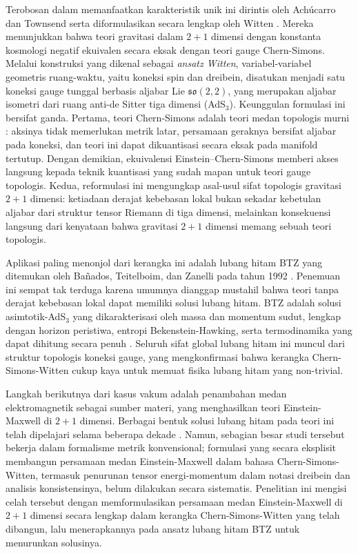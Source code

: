 Terobosan dalam memanfaatkan karakteristik unik ini dirintis oleh Ach\'ucarro dan Townsend \cite{achucarro1986} serta diformulasikan secara lengkap oleh Witten \cite{witten1988}. Mereka menunjukkan bahwa teori gravitasi dalam $2+1$ dimensi dengan konstanta kosmologi negatif ekuivalen secara eksak dengan teori gauge Chern-Simons. Melalui konstruksi yang dikenal sebagai \textit{ansatz Witten}, variabel-variabel geometris ruang-waktu, yaitu koneksi spin dan dreibein, disatukan menjadi satu koneksi gauge tunggal berbasis aljabar Lie $\mathfrak{so}(2,2)$, yang merupakan aljabar isometri dari ruang anti-de Sitter tiga dimensi (AdS$_3$). Keunggulan formulasi ini bersifat ganda. Pertama, teori Chern-Simons adalah teori medan topologis murni \cite{witten1989jones}: aksinya tidak memerlukan metrik latar, persamaan geraknya bersifat aljabar pada koneksi, dan teori ini dapat dikuantisasi secara eksak pada manifold tertutup. Dengan demikian, ekuivalensi Einstein--Chern-Simons memberi akses langsung kepada teknik kuantisasi yang sudah mapan untuk teori gauge topologis. Kedua, reformulasi ini mengungkap asal-usul sifat topologis gravitasi $2+1$ dimensi: ketiadaan derajat kebebasan lokal bukan sekadar kebetulan aljabar dari struktur tensor Riemann di tiga dimensi, melainkan konsekuensi langsung dari kenyataan bahwa gravitasi $2+1$ dimensi memang sebuah teori topologis.

Aplikasi paling menonjol dari kerangka ini adalah lubang hitam BTZ yang ditemukan oleh Ba\~nados, Teitelboim, dan Zanelli pada tahun 1992 \cite{banados1992, banados1993}. Penemuan ini sempat tak terduga karena umumnya dianggap mustahil bahwa teori tanpa derajat kebebasan lokal dapat memiliki solusi lubang hitam. BTZ adalah solusi asimtotik-AdS$_3$ yang dikarakterisasi oleh massa dan momentum sudut, lengkap dengan horizon peristiwa, entropi Bekenstein-Hawking, serta termodinamika yang dapat dihitung secara penuh \cite{carlip1995btz}. Seluruh sifat global lubang hitam ini muncul dari struktur topologis koneksi gauge, yang mengkonfirmasi bahwa kerangka Chern-Simons-Witten cukup kaya untuk memuat fisika lubang hitam yang non-trivial.

Langkah berikutnya dari kasus vakum adalah penambahan medan elektromagnetik sebagai sumber materi, yang menghasilkan teori Einstein-Maxwell di $2+1$ dimensi. Berbagai bentuk solusi lubang hitam pada teori ini telah dipelajari selama beberapa dekade \cite{clement1993, cataldo1996, clement1996, martinez2000, garcia2017exact, kubiznak2024, maeda2024}. Namun, sebagian besar studi tersebut bekerja dalam formalisme metrik konvensional; formulasi yang secara eksplisit membangun persamaan medan Einstein-Maxwell dalam bahasa Chern-Simons-Witten, termasuk penurunan tensor energi-momentum dalam notasi dreibein dan analisis konsistensinya, belum dilakukan secara sistematis. Penelitian ini mengisi celah tersebut dengan memformulasikan persamaan medan Einstein-Maxwell di $2+1$ dimensi secara lengkap dalam kerangka Chern-Simons-Witten yang telah dibangun, lalu menerapkannya pada ansatz lubang hitam BTZ untuk menurunkan solusinya.

